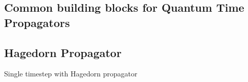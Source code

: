 \subsection{Common building blocks for Quantum Time Propagators}


\subsection{Hagedorn Propagator}
%
\begin{algorithm}[h]
	\caption{Single timestep with Hagedorn propagator}
	\label{alg:hagedorn}
	\begin{algorithmic}
			\State {}
			\State {}
			\State {}
			\State {}
		\EndProcedure
	\end{algorithmic}
\end{algorithm}


